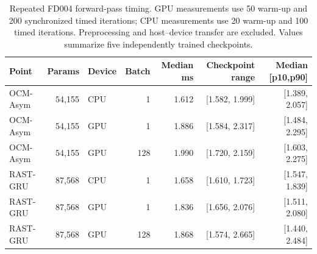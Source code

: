 \begin{table}[!t]
\centering
\scriptsize
\caption{Repeated FD004 forward-pass timing. GPU measurements use 50 warm-up and 200 synchronized timed iterations; CPU measurements use 20 warm-up and 100 timed iterations. Preprocessing and host--device transfer are excluded. Values summarize five independently trained checkpoints.}
\label{tab:inference-latency-protocol}
\begin{tabular}{lrlrrrr}
\toprule
Point & Params & Device & Batch & Median ms & Checkpoint range & Median [p10,p90] \\
\midrule
OCM-Asym & 54,155 & CPU & 1 & 1.612 & [1.582, 1.999] & [1.389, 2.057] \\
OCM-Asym & 54,155 & GPU & 1 & 1.886 & [1.584, 2.317] & [1.484, 2.295] \\
OCM-Asym & 54,155 & GPU & 128 & 1.990 & [1.720, 2.159] & [1.603, 2.275] \\
RAST-GRU & 87,568 & CPU & 1 & 1.658 & [1.610, 1.723] & [1.547, 1.839] \\
RAST-GRU & 87,568 & GPU & 1 & 1.836 & [1.656, 2.076] & [1.511, 2.080] \\
RAST-GRU & 87,568 & GPU & 128 & 1.868 & [1.574, 2.665] & [1.440, 2.484] \\
\bottomrule
\end{tabular}
\end{table}

